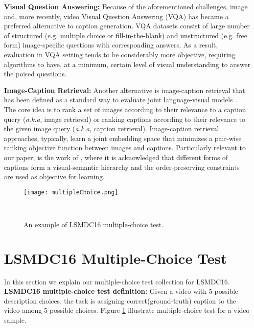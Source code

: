 \documentclass[runningheads]{llncs}
\begin{document}
\noindent
{\bf Visual Question Answering:}
Because of the aforementioned challenges, image \cite{VQA,gao2015mQA,948} and, more recently, video \cite{Linchao2015} Visual Question Answering (VQA) has became a preferred alternative to caption generation. VQA datasets \cite{VQA,gao2015mQA,tapaswi16cvpr,Linchao2015} consist of large number of structured (e.g. multiple choice or fill-in-the-blank) and unstructured (e.g. free form) image-specific questions with corresponding answers. As a result, evaluation in VQA setting tends to be considerably more objective, requiring algorithms to have, at a minimum, certain level of visual understanding to answer the poised questions. 

\noindent
{\bf Image-Caption Retrieval:}
Another alternative is image-caption retrieval that has been defined as a standard way to evaluate joint language-visual models \cite{hodosh13jair,kiros15tacl,lin14cvpr,IvanVendrov2015}. The core idea is to rank a set of images according to their relevance to a caption query ({\em a.k.a}, image retrieval) or ranking captions according to their relevance to the given image query ({\em a.k.a}, caption retrieval). 
Image-caption retrieval approaches, typically, learn a joint embedding space that minimizes a pair-wise ranking objective function between images and captions. Particularly relevant to our paper, is the work of \cite{IvanVendrov2015}, where it is acknowledged that different forms of captions form a visual-semantic hierarchy and the order-preserving constraints are used as objective for learning.
\begin{figure}[ht]
\begin{center}
\texttt{[image: multipleChoice.png]}
\end{center}
\vspace{-0.2in}
   \caption{ An example of LSMDC16 multiple-choice test.}
\label{overview}
\label{fig:Multiplechoice}\
\vspace{-0.5in}
\end{figure}

\section{LSMDC16 Multiple-Choice Test}
\label{multiplechoice}
In this section we explain our multiple-choice test collection for LSMDC16.\\

\noindent
{\bf LSMDC16 multiple-choice test definition:} Given a video with 5 possible description choices, the task is assigning correct(ground-truth) caption to the video among 5 possible choices. Figure \ref{fig:Multiplechoice} illustrate multiple-choice test for a video sample. 
\end{document}
